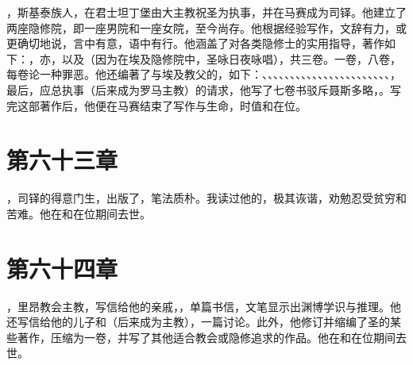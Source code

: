 ，斯基泰族人，在君士坦丁堡由大主教祝圣为执事，并在马赛成为司铎。他建立了两座隐修院，即一座男院和一座女院，至今尚存。他根据经验写作，文辞有力，或更确切地说，言中有意，语中有行。他涵盖了对各类隐修士的实用指导，著作如下：，亦，以及（因为在埃及隐修院中，圣咏日夜咏唱），共三卷。一卷，八卷，每卷论一种罪恶。他还编著了与埃及教父的，如下：、、、、、、、、、、、、、、、、、、、、、、、，最后，应总执事（后来成为罗马主教）的请求，他写了七卷书驳斥聂斯多略，。写完这部著作后，他便在马赛结束了写作与生命，时值和在位。\par


\section{第六十三章}

，司铎的得意门生，出版了，笔法质朴。我读过他的，极其诙谐，劝勉忍受贫穷和苦难。他在和在位期间去世。\par


\section{第六十四章}

，里昂教会主教，写信给他的亲戚，，单篇书信，文笔显示出渊博学识与推理。他还写信给他的儿子和（后来成为主教），一篇讨论。此外，他修订并缩编了圣的某些著作，压缩为一卷，并写了其他适合教会或隐修追求的作品。他在和在位期间去世。\par


